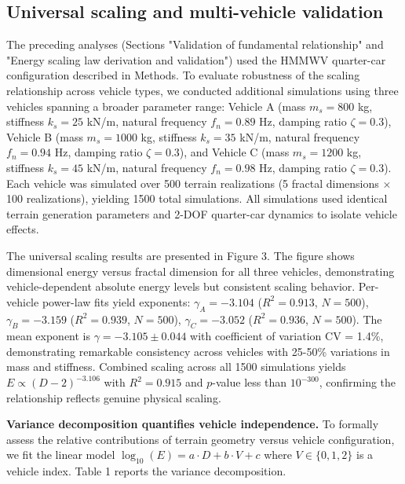 \documentclass[11pt,letterpaper]{article}
\begin{document}
\subsection{Universal scaling and multi-vehicle validation}

The preceding analyses (Sections "Validation of fundamental relationship" and "Energy scaling law derivation and validation") used the HMMWV quarter-car configuration described in Methods. To evaluate robustness of the scaling relationship across vehicle types, we conducted additional simulations using three vehicles spanning a broader parameter range: Vehicle A (mass $m_s = 800$ kg, stiffness $k_s = 25$ kN/m, natural frequency $f_n = 0.89$ Hz, damping ratio $\zeta = 0.3$), Vehicle B (mass $m_s = 1000$ kg, stiffness $k_s = 35$ kN/m, natural frequency $f_n = 0.94$ Hz, damping ratio $\zeta = 0.3$), and Vehicle C (mass $m_s = 1200$ kg, stiffness $k_s = 45$ kN/m, natural frequency $f_n = 0.98$ Hz, damping ratio $\zeta = 0.3$). Each vehicle was simulated over 500 terrain realizations (5 fractal dimensions $\times$ 100 realizations), yielding 1500 total simulations. All simulations used identical terrain generation parameters and 2-DOF quarter-car dynamics to isolate vehicle effects.

The universal scaling results are presented in Figure 3. The figure shows dimensional energy versus fractal dimension for all three vehicles, demonstrating vehicle-dependent absolute energy levels but consistent scaling behavior. Per-vehicle power-law fits yield exponents: $\gamma_A = -3.104$ ($R^2 = 0.913$, $N = 500$), $\gamma_B = -3.159$ ($R^2 = 0.939$, $N = 500$), $\gamma_C = -3.052$ ($R^2 = 0.936$, $N = 500$). The mean exponent is $\gamma = -3.105 \pm 0.044$ with coefficient of variation CV = 1.4\%, demonstrating remarkable consistency across vehicles with 25-50\% variations in mass and stiffness. Combined scaling across all 1500 simulations yields $E \propto (D-2)^{-3.106}$ with $R^2 = 0.915$ and $p$-value less than $10^{-300}$, confirming the relationship reflects genuine physical scaling.

\textbf{Variance decomposition quantifies vehicle independence.} To formally assess the relative contributions of terrain geometry versus vehicle configuration, we fit the linear model $\log_{10}(E) = a \cdot D + b \cdot V + c$ where $V \in \{0,1,2\}$ is a vehicle index. Table 1 reports the variance decomposition.
\end{document}

